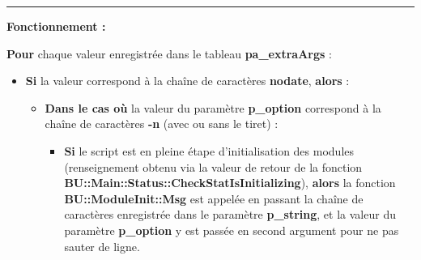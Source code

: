 \documentclass[a4paper,10pt]{article}
\begin{document}
\setlength{\parskip}{2em}


\par\noindent\rule{\textwidth}{0.4pt}

\setlength{\parskip}{1em}

\begin{justify}
    \textbf{Fonctionnement :}

    \textbf{\color{loop}Pour} chaque valeur enregistrée dans le tableau \textbf{\color{vars}pa\_extraArgs} :
\end{justify}

\begin{itemize}
    \item
    {
        \begin{justify}
            \textbf{\color{cond}Si} la valeur correspond à la chaîne de caractères \textbf{nodate}, \textbf{\color{cond}alors} :
        \end{justify}

        \setlength{\parskip}{1em}

        \begin{itemize}
            \item
            {
                \begin{justify}
                    \textbf{\color{case}Dans le cas où} la valeur du paramètre \textbf{\color{vars}p\_option} correspond à la chaîne de caractères \textbf{-n} (avec ou sans le tiret) :
                \end{justify}

                \setlength{\parskip}{1em}

                \begin{itemize}
                    \item
                    {
                        \begin{justify}
                            \textbf{\color{cond}Si} le script est en pleine étape d'initialisation des modules (renseignement obtenu via la valeur de retour de la fonction \textbf{\color{func}BU::Main::Status::CheckStatIsInitializing}), \textbf{\color{cond}alors} la fonction \textbf{\color{func}BU::ModuleInit::Msg} est appelée en passant la chaîne de caractères enregistrée dans le paramètre \textbf{\color{vars}p\_string}, et la valeur du paramètre \textbf{\color{vars}p\_option} y est passée en second argument pour ne pas sauter de ligne.
                        \end{justify}

}
\end{itemize}}
\end{itemize}}
\end{itemize}
\end{document}
